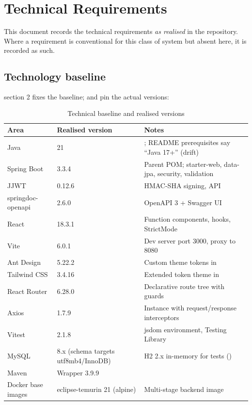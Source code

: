 \section{Technical Requirements}
\label{sec:technical-requirements}

This document records the technical requirements \emph{as realised} in the repository. Where a requirement is conventional for this class of system but absent here, it is recorded as such.

\subsection{Technology baseline}

 section 2 fixes the baseline;  and  pin the actual versions:

\begin{table}[H]
\centering
\caption{Technical baseline and realised versions}
\label{tab:tech-baseline}
\begin{tabular}{@{}L{3.6cm}L{4.4cm}L{6.2cm}@{}}
\toprule
\textbf{Area} & \textbf{Realised version} & \textbf{Notes} \\
\midrule
Java & 21 & ; README prerequisites say ``Java 17+'' (drift) \\
Spring Boot & 3.3.4 & Parent POM; starter-web, data-jpa, security, validation \\
JJWT & 0.12.6 & HMAC-SHA signing,  API \\
springdoc-openapi & 2.6.0 & OpenAPI 3 + Swagger UI \\
React & 18.3.1 & Function components, hooks, StrictMode \\
Vite & 6.0.1 & Dev server port 3000,  proxy to 8080 \\
Ant Design & 5.22.2 & Custom theme tokens in  \\
Tailwind CSS & 3.4.16 & Extended token theme in  \\
React Router & 6.28.0 & Declarative route tree with guards \\
Axios & 1.7.9 & Instance with request/response interceptors \\
Vitest & 2.1.8 & jsdom environment, Testing Library \\
MySQL & 8.x (schema targets utf8mb4/InnoDB) & H2 2.x in-memory for tests () \\
Maven & Wrapper 3.9.9 &  \\
Docker base images & eclipse-temurin 21 (alpine) & Multi-stage backend image \\
\bottomrule
\end{tabular}
\end{table}

